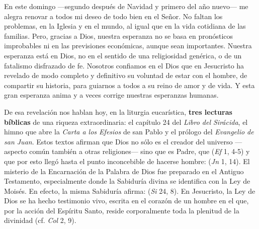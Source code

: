 				\begin{body}
					En este domingo ---segundo después de Navidad y primero del año nuevo--- me alegra renovar a todos mi deseo de todo bien en el Señor. No faltan los problemas, en la Iglesia y en el mundo, al igual que en la vida cotidiana de las familias. Pero, gracias a Dios, nuestra esperanza no se basa en pronósticos improbables ni en las previsiones económicas, aunque sean importantes. Nuestra esperanza está en Dios, no en el sentido de una religiosidad genérica, o de un fatalismo disfrazado de fe. Nosotros confiamos en el Dios que en Jesucristo ha revelado de modo completo y definitivo su voluntad de estar con el hombre, de compartir su historia, para guiarnos a todos a su reino de amor y de vida. Y esta gran esperanza anima y a veces corrige nuestras esperanzas humanas.
					
					De esa revelación nos hablan hoy, en la liturgia eucarística, \textbf{tres lecturas bíblicas} de una riqueza extraordinaria: el capítulo 24 del \emph{Libro del Sirácida}, el himno que abre la \emph{Carta a los Efesios} de san Pablo y el prólogo del \emph{Evangelio de san Juan}. Estos textos afirman que Dios no sólo es el creador del universo ---aspecto común también a otras religiones--- sino que es Padre, que  (\emph{Ef} 1, 4-5) y que por esto llegó hasta el punto inconcebible de hacerse hombre:  (\emph{Jn} 1, 14). El misterio de la Encarnación de la Palabra de Dios fue preparado en el Antiguo Testamento, especialmente donde la Sabiduría divina se identifica con la Ley de Moisés. En efecto, la misma Sabiduría afirma:  (\emph{Si} 24, 8). En Jesucristo, la Ley de Dios se ha hecho testimonio vivo, escrita en el corazón de un hombre en el que, por la acción del Espíritu Santo, reside corporalmente toda la plenitud de la divinidad (cf. \emph{Col} 2, 9).
					

\end{body}
